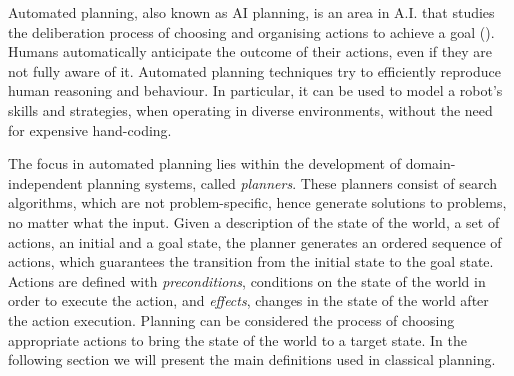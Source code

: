

Automated planning, also known as AI planning, is an area in A.I. that studies the deliberation process of choosing and organising actions to achieve a goal (\cite{ghallab2004automated}). 
Humans automatically anticipate the outcome of their actions, even if they are not fully aware of it. 
Automated planning techniques try to %
 efficiently reproduce human reasoning and behaviour. 
In particular, it can be used to model a robot's skills and strategies, when operating in diverse environments, without the need for expensive hand-coding.

The focus in automated planning lies within the development of {domain-independent} planning systems, called \textit{planners}.
These planners consist of search algorithms, which are not problem-specific, hence generate solutions to problems, no matter what the input. 
Given a description of the state of the world,  a set of actions, an initial and a goal state, the planner generates an ordered sequence of actions, which guarantees the transition from the initial state to the goal state. 
Actions are defined with \textit{preconditions}, \ie conditions on the state of the world in order to execute the action, and \textit{effects}, \ie changes in the state of the world after the action execution.
Planning can be considered the process of choosing appropriate actions to bring the state of the world to a target state.
In the following section we will present the main definitions used in classical planning.

